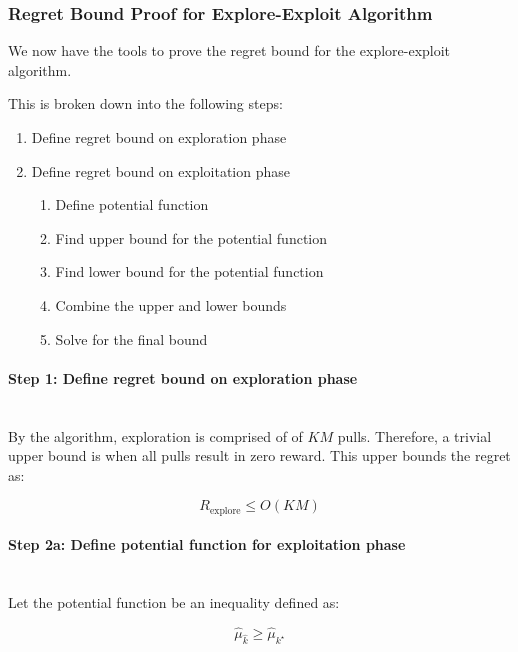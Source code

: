 \documentclass[11pt]{article}
\begin{document}
\subsubsection{Regret Bound Proof for Explore-Exploit Algorithm}

We now have the tools to prove the regret bound for the explore-exploit algorithm.

This is broken down into the following steps:

\begin{enumerate}
    \item Define regret bound on exploration phase
    \item Define regret bound on exploitation phase
    \begin{enumerate}
        \item Define potential function 
        \item Find upper bound for the potential function
        \item Find lower bound for the potential function
        \item Combine the upper and lower bounds
        \item Solve for the final bound
    \end{enumerate}
\end{enumerate}

\paragraph{Step 1: Define regret bound on exploration phase}
\noindent \\
By the algorithm, exploration is comprised of of $KM$ pulls. Therefore, a trivial upper bound is when all pulls result in zero reward. This upper bounds the regret as:

\begin{equation}
    R_{\text{explore}} \leq O(KM)
\end{equation}

\paragraph{Step 2a: Define potential function for exploitation phase}
\noindent \\
Let the potential function be an inequality defined as:

\begin{equation}
    \hat{\mu}_{\hat{k}} \geq \hat{\mu}_{k^\star}
\end{equation}
\end{document}
